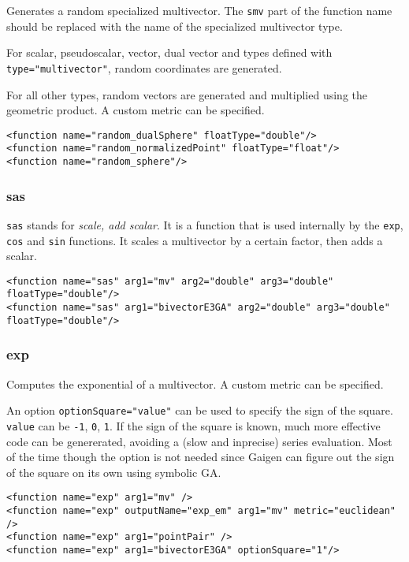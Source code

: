 \documentclass[10pt, a4paper]{article}
\begin{document}
Generates a random specialized multivector. The {\tt smv} part of the function
name should be replaced with the name of the specialized multivector type.

For scalar, pseudoscalar, vector, dual vector and types defined with
{\tt type="multivector"}, random coordinates are generated.

For all other types, random vectors are generated and multiplied using the 
geometric product. A custom metric can be specified.
\begin{verbatim}
<function name="random_dualSphere" floatType="double"/>
<function name="random_normalizedPoint" floatType="float"/>
<function name="random_sphere"/>
\end{verbatim}

\subsubsection*{sas}

{\tt sas} stands for \emph{scale, add scalar}. 
It is a function that is used internally
by the {\tt exp}, {\tt cos} and {\tt sin} functions.
It scales a multivector by a certain factor, then adds a scalar.
\begin{verbatim}
<function name="sas" arg1="mv" arg2="double" arg3="double" floatType="double"/>
<function name="sas" arg1="bivectorE3GA" arg2="double" arg3="double" floatType="double"/>
\end{verbatim}

\subsubsection*{exp}

Computes the exponential of a multivector.
A custom metric can be specified.

An option {\tt optionSquare="value"} can be used to specify the 
sign of the square. {\tt value} can be {\tt -1}, {\tt 0}, {\tt 1}.
If the sign of the square is known, much more effective code can be genererated, avoiding 
a (slow and inprecise) series evaluation. Most of the time though the option is
not needed since Gaigen can figure out the sign of the square on its own using symbolic GA. 
\begin{verbatim}
<function name="exp" arg1="mv" />
<function name="exp" outputName="exp_em" arg1="mv" metric="euclidean" />
<function name="exp" arg1="pointPair" />
<function name="exp" arg1="bivectorE3GA" optionSquare="1"/>
\end{verbatim}
\end{document}
